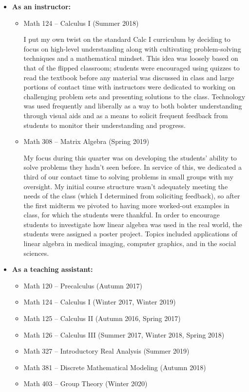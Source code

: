 \documentclass[margin]{res} %
\begin{document}
\begin{resume}
\begin{itemize} \itemsep -1pt %
\item\textbf{As an instructor:} 
\begin{itemize}
	\item Math 124 -- Calculus I (Summer 2018)\vspace{5pt}

	I put my own twist on the standard Calc I curriculum by deciding to focus on high-level understanding along with cultivating problem-solving techniques and a mathematical mindset.
	This idea was loosely based on that of the flipped classroom; students were encouraged using quizzes to read the textbook before any material was discussed in class and large portions of contact time with instructors were dedicated to working on challenging problem sets and presenting solutions to the class.
	Technology was used frequently and liberally as a way to both bolster understanding through visual aids and as a means to solicit frequent feedback from students to monitor their understanding and progress.\vspace{5pt}
	\item Math 308 -- Matrix Algebra (Spring 2019)\vspace{5pt}
	
	My focus during this quarter was on developing the students' ability to solve problems they hadn't seen before. In service of this, we dedicated a third of our contact time to solving problems in small groups with my oversight.
	My initial course structure wasn't adequately meeting the needs of the class (which I determined from soliciting feedback), so after the first midterm we pivoted to having more worked-out examples in class, for which the students were thankful.
	In order to encourage students to investigate how linear algebra was used in the real world, the students were assigned a poster project. Topics included applications of linear algebra in medical imaging, computer graphics, and in the social sciences. 
\end{itemize}
\item \textbf{As a teaching assistant:} 
\begin{itemize}
	\item Math 120 -- Precalculus (Autumn 2017)
	\item Math 124 -- Calculus I (Winter 2017, Winter 2019)
	\item Math 125 -- Calculus II (Autumn 2016, Spring 2017)
	\item Math 126 -- Calculus III (Summer 2017, Winter 2018, Spring 2018)
	\item Math 327 -- Introductory Real Analysis (Summer 2019)
	\item Math 381 -- Discrete Mathematical Modeling (Autumn 2018)
	\item Math 403 -- Group Theory (Winter 2020)
\end{itemize}
\end{itemize}
 

\end{resume}
\end{document}
